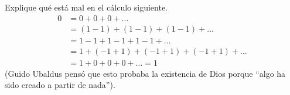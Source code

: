 \item Explique qué está mal en el cálculo siguiente.
    \begin{align*}
        0 &= 0 + 0 + 0 + \dots \\
        &= (1 - 1) + (1 - 1) + (1 - 1) + \dots \\
        &= 1 - 1 + 1 - 1 + 1 - 1 + \dots \\
        &= 1 + (-1 + 1) + (-1 + 1) + (-1 + 1) + \dots \\
        &= 1 + 0 + 0 + 0 + \dots = 1
    \end{align*}
    (Guido Ubaldus pensó que esto probaba la existencia de Dios porque ``algo ha sido creado a partir de nada'').
